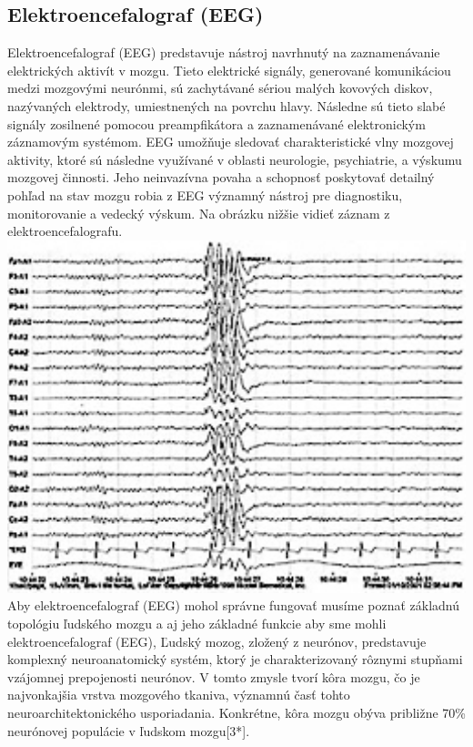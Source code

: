 \subsection{Elektroencefalograf (EEG)}
\tab[5 mm] Elektroencefalograf (EEG) predstavuje nástroj navrhnutý na zaznamenávanie elektrických aktivít v mozgu. Tieto elektrické signály, generované komunikáciou medzi mozgovými neurónmi, sú zachytávané sériou malých kovových diskov, nazývaných elektrody, umiestnených na povrchu hlavy. Následne sú tieto slabé signály zosilnené pomocou preampfikátora a zaznamenávané elektronickým záznamovým systémom. EEG umožňuje sledovať charakteristické vlny mozgovej aktivity, ktoré sú následne využívané v oblasti neurologie, psychiatrie, a výskumu mozgovej činnosti. Jeho neinvazívna povaha a schopnosť poskytovať detailný pohľad na stav mozgu robia z EEG významný nástroj pre diagnostiku, monitorovanie a vedecký výskum. Na obrázku nižšie vidieť záznam z elektroencefalografu.\\
\includegraphics[width=1.0\textwidth]{images/eeg.jpg}\\
\tab[5 mm] Aby elektroencefalograf (EEG) mohol správne fungovať musíme poznať základnú topológiu ľudského mozgu a aj jeho základné funkcie aby sme mohli elektroencefalograf (EEG), Ľudský mozog, zložený z neurónov, predstavuje komplexný neuroanatomický systém, ktorý je charakterizovaný rôznymi stupňami vzájomnej prepojenosti neurónov. V tomto zmysle tvorí kôra mozgu, čo je najvonkajšia vrstva mozgového tkaniva, významnú časť tohto neuroarchitektonického usporiadania. Konkrétne, kôra mozgu obýva približne 70\% neurónovej populácie v ľudskom mozgu[3*]. 

